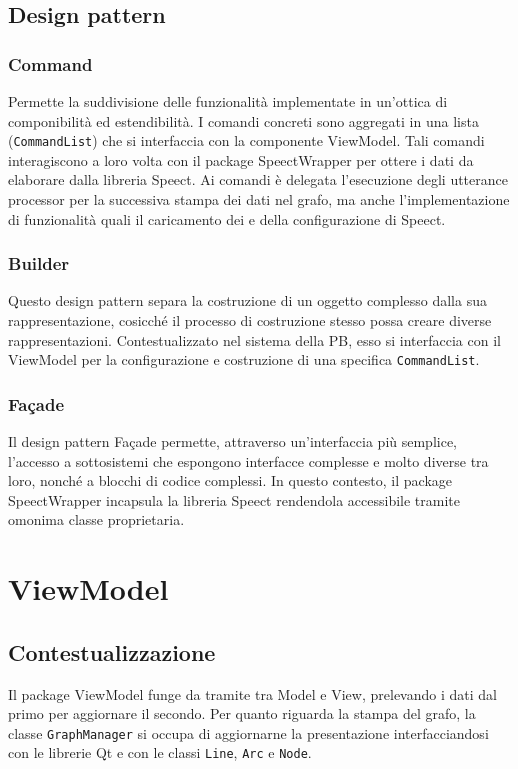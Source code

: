 \documentclass[openany,12pt,a4paper]{report}
\begin{document}
\newpage

\subsection{Design pattern}

\subsubsection{Command}
Permette la suddivisione delle funzionalità implementate in un'ottica di componibilità ed estendibilità. I comandi concreti sono aggregati in una lista (\verb|CommandList|) che si interfaccia con la componente ViewModel. Tali comandi interagiscono a loro volta con il package SpeectWrapper per ottere i dati da elaborare dalla libreria Speect. Ai comandi è delegata l'esecuzione degli utterance processor per la successiva stampa dei dati nel grafo, ma anche l'implementazione di funzionalità quali il caricamento dei  e della configurazione di Speect.

\subsubsection{Builder}
Questo design pattern separa la costruzione di un oggetto complesso dalla sua rappresentazione, cosicché il processo di costruzione stesso possa creare diverse rappresentazioni. Contestualizzato nel sistema della PB, esso si interfaccia con il ViewModel per la configurazione e costruzione di una specifica \verb|CommandList|.

\subsubsection{Façade} 
Il design pattern Façade permette, attraverso un'interfaccia più semplice, l'accesso a sottosistemi che espongono interfacce complesse e molto diverse tra loro, nonché a blocchi di codice complessi. In questo contesto, il package SpeectWrapper incapsula la libreria Speect rendendola accessibile tramite omonima classe proprietaria.

\newpage

\section{ViewModel}

\subsection{Contestualizzazione}
Il package ViewModel funge da tramite tra Model e View, prelevando i dati dal primo per aggiornare il secondo. Per quanto riguarda la stampa del grafo, la classe \verb|GraphManager| si occupa di aggiornarne la presentazione interfacciandosi con le librerie Qt e con le classi \verb|Line|, \verb|Arc| e \verb|Node|.  
\end{document}
